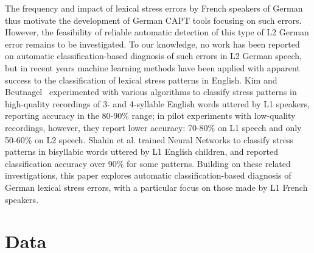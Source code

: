 \documentclass[a4paper]{article}
\begin{document}
	The frequency and impact of lexical stress errors by French speakers of German thus motivate the development of German CAPT tools focusing on such errors.
	However, the feasibility of reliable automatic detection of this type of L2 German error remains to be investigated. 
	To our knowledge, no work has been reported on automatic classification-based diagnosis of 
	such errors in L2 German speech, 
	but in recent years machine learning methods have been applied with apparent success to the classification of lexical stress patterns in English. 
	Kim and Beutnagel~\cite{Kim2011} experimented with various algorithms to classify stress patterns in high-quality recordings of 3- and 4-syllable English words uttered by L1 speakers, reporting accuracy in the 80-90\% range; in pilot experiments with low-quality recordings, however, they report lower accuracy: 70-80\% on L1 speech and only 50-60\% on L2 speech. 
	Shahin et al. \cite{Shahin2012a} trained Neural Networks to classify stress patterns in bisyllabic words uttered by L1 English children, 
	and reported classification accuracy over 90\% for some patterns. %
	Building on these related investigations, this paper explores 
	automatic classification-based diagnosis of German lexical stress errors, with a particular focus on those made by L1 French speakers.
	
	
	\section{Data}
	\label{sec:data}
	
\end{document}
